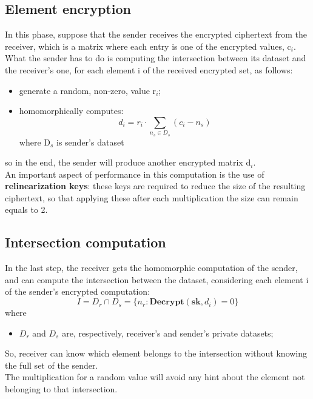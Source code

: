 \documentclass[10pt]{extarticle}
\begin{document}
\subsection{Element encryption}
In this phase, suppose that the sender receives the encrypted ciphertext from the receiver, which is a matrix where each entry is one of the encrypted values, c$_i$.\\What the sender has to do is computing the intersection between its dataset and the receiver's one, for each element i of the received encrypted set, as follows:
\begin{itemize}
    \item generate a random, non-zero, value r$_i$;
    \item homomorphically computes:
        \begin{equation}
            d_i = r_i \cdot \sum\limits_{n_s \in D_s} (c_i - n_s)
        \end{equation}
    where D$_s$ is sender's dataset
\end{itemize}
so in the end, the sender will produce another encrypted matrix d$_i$.\\
An important aspect of performance in this computation is the use of \textbf{relinearization keys}: these keys are required to reduce the size of the resulting ciphertext, so that applying these after each multiplication the size can remain equals to 2.

\subsection{Intersection computation}
In the last step, the receiver gets the homomorphic computation of the sender, and can compute the intersection between the dataset, considering each element i of the sender's encrypted computation:
\begin{equation}
    I = D_r \cap D_s = \{n_r: \textbf{Decrypt}(\textbf{sk}, d_i) = 0\}
\end{equation}
where 
\begin{itemize}
	\item $D_r$ and $D_s$ are, respectively, receiver's and sender's private datasets;
\end{itemize}
So, receiver can know which element belongs to the intersection without knowing the full set of the sender.\\
The multiplication for a random value will avoid any hint about the element not belonging to that intersection.
\end{document}
